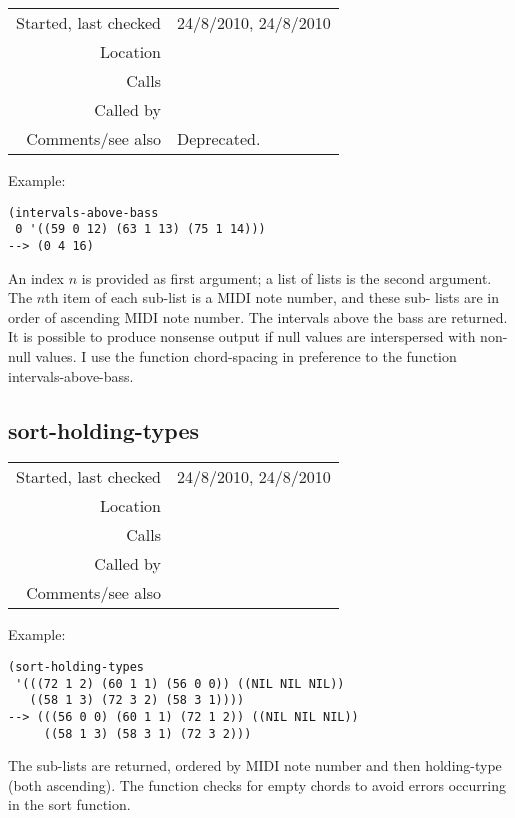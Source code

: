 \vspace{0.3cm}
\begin{tabular}{r|p{8cm}}
Started, last checked & 24/8/2010, 24/8/2010 \\
Location & \nameref{sec:spacing-states} \\
Calls & \\
Called by & \\
Comments/see also & Deprecated.
\end{tabular}

\vspace{0.5cm}
\noindent Example:
\begin{verbatim}
(intervals-above-bass
 0 '((59 0 12) (63 1 13) (75 1 14)))
--> (0 4 16)
\end{verbatim}

\noindent An index $n$ is provided as first argument;
a list of lists is the second argument. The $n$th item
of each sub-list is a MIDI note number, and these sub-
lists are in order of ascending MIDI note number. The
intervals above the bass are returned. It is possible
to produce nonsense output if null values are
interspersed with non-null values. I use the function
chord-spacing in preference to the function
intervals-above-bass.


\subsection*{sort-holding-types}\label{fun:sort-holding-types}

\vspace{0.3cm}
\begin{tabular}{r|p{8cm}}
Started, last checked & 24/8/2010, 24/8/2010 \\
Location & \nameref{sec:spacing-states} \\
Calls & \nameref{fun:sort-by} \\
Called by & \nameref{fun:spacing-holding-states} \\
Comments/see also &
\end{tabular}

\vspace{0.5cm}
\noindent Example:
\begin{verbatim}
(sort-holding-types
 '(((72 1 2) (60 1 1) (56 0 0)) ((NIL NIL NIL))
   ((58 1 3) (72 3 2) (58 3 1))))
--> (((56 0 0) (60 1 1) (72 1 2)) ((NIL NIL NIL))
     ((58 1 3) (58 3 1) (72 3 2)))
\end{verbatim}

\noindent The sub-lists are returned, ordered by MIDI
note number and then holding-type (both ascending).
The function checks for empty chords to avoid errors
occurring in the sort function.



